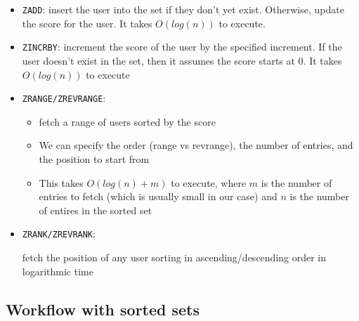 \documentclass{report}
\theoremstyle{definition}
\let\oldsubsection\subsection
\renewcommand{\subsection}{\oldsubsection*}
\begin{document}
\begin{itemize}
\item
\lstinline|ZADD|: insert the user into the set if they don't yet exist. Otherwise, update the score for the user. It takes $O(log(n))$ to execute.
\item
\lstinline|ZINCRBY|: increment the score of the user by the specified increment. If the user doesn't exist in the set, then it assumes the score starts at 0. It takes $O(log(n))$ to execute
\item
\lstinline|ZRANGE/ZREVRANGE|:

\begin{itemize}
\item
fetch a range of users sorted by the score
\item
We can specify the order (range vs revrange), the number of entries, and the position to start from
\item
This takes $O(log(n) + m)$ to execute, where $m$ is the number of entries to fetch (which is usually small in our case) and $n$ is the number of entires in the sorted set
\end{itemize}

\item
\lstinline|ZRANK/ZREVRANK|:

fetch the position of any user sorting in ascending/descending order in logarithmic time
\end{itemize}

\subsection{Workflow with sorted sets}
\end{document}
